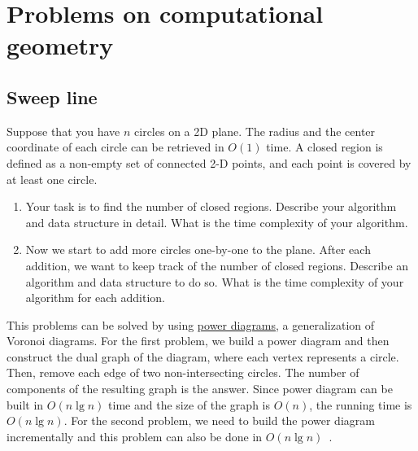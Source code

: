 \chapter{Problems on computational geometry}

\section{Sweep line}
\begin{Exercise}[title={Power diagrams},origin={NTU CSIE 103},difficulty=2]
Suppose that you have $n$ circles on a 2D plane. The radius and the center coordinate of each circle can be retrieved in $O(1)$ time. A closed region is defined as a non-empty set of connected 2-D points, and each point is covered by at least one circle.
\begin{enumerate}
\item Your task is to find the number of closed regions. Describe your algorithm and data structure in detail. What is the time complexity of your algorithm.
\item Now we start to add more circles one-by-one to the plane. After each addition, we want to keep track of the number of closed regions. Describe an algorithm and data structure to do so. What is the time complexity of your algorithm for each addition.
\end{enumerate}
\end{Exercise}
\begin{Answer}
This problems can be solved by using \href{https://en.wikipedia.org/wiki/Power_diagram}{power diagrams}, a generalization of Voronoi diagrams. For the first problem, we build a power diagram and then construct the dual graph of the diagram, where each vertex represents a circle. Then, remove each edge of two non-intersecting circles. The number of components of the resulting graph is the answer. Since power diagram can be built in $O(n \lg n)$ time and the size of the graph is $O(n)$, the running time is $O(n \lg n)$. For the second problem, we need to build the power diagram incrementally and this problem can also be done in $O(n \lg n)$~\cite{Aurenhammer1988}.
\end{Answer}

